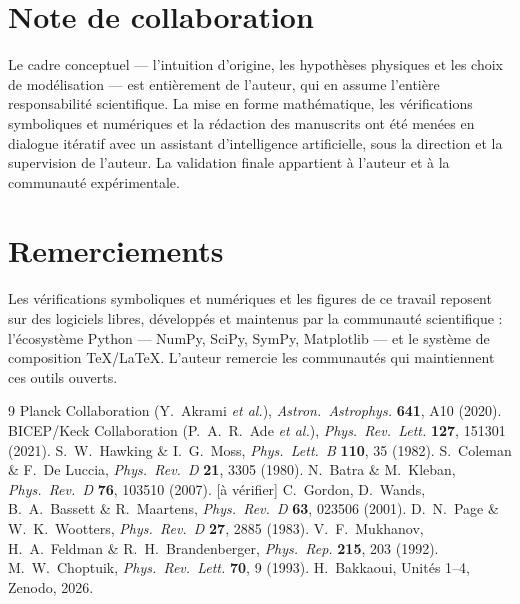 \documentclass[11pt,a4paper]{article}
\begin{document}
\section*{Note de collaboration}
Le cadre conceptuel --- l'intuition d'origine, les hypoth\`eses physiques et les choix de mod\'elisation --- est enti\`erement de l'auteur, qui en assume l'enti\`ere responsabilit\'e scientifique. La mise en forme math\'ematique, les v\'erifications symboliques et num\'eriques et la r\'edaction des manuscrits ont \'et\'e men\'ees en dialogue it\'eratif avec un assistant d'intelligence artificielle, sous la direction et la supervision de l'auteur. La validation finale appartient \`a l'auteur et \`a la communaut\'e exp\'erimentale.

\section*{Remerciements}
Les v\'erifications symboliques et num\'eriques et les figures de ce travail reposent sur des logiciels libres, d\'evelopp\'es et maintenus par la communaut\'e scientifique : l'\'ecosyst\`eme Python --- NumPy, SciPy, SymPy, Matplotlib --- et le syst\`eme de composition \TeX/\LaTeX{}. L'auteur remercie les communaut\'es qui maintiennent ces outils ouverts.

\begin{thebibliography}{9}
\small
{} Planck Collaboration (Y.\ Akrami \textit{et al.}), \textit{Astron.\ Astrophys.} \textbf{641}, A10 (2020).
 BICEP/Keck Collaboration (P.\ A.\ R.\ Ade \textit{et al.}), \textit{Phys.\ Rev.\ Lett.} \textbf{127}, 151301 (2021).
 S.\ W.\ Hawking \& I.\ G.\ Moss, \textit{Phys.\ Lett.\ B} \textbf{110}, 35 (1982).
 S.\ Coleman \& F.\ De Luccia, \textit{Phys.\ Rev.\ D} \textbf{21}, 3305 (1980).
 N.\ Batra \& M.\ Kleban, \textit{Phys.\ Rev.\ D} \textbf{76}, 103510 (2007). [à vérifier]
 C.\ Gordon, D.\ Wands, B.\ A.\ Bassett \& R.\ Maartens, \textit{Phys.\ Rev.\ D} \textbf{63}, 023506 (2001).
 D.\ N.\ Page \& W.\ K.\ Wootters, \textit{Phys.\ Rev.\ D} \textbf{27}, 2885 (1983).
 V.\ F.\ Mukhanov, H.\ A.\ Feldman \& R.\ H.\ Brandenberger, \textit{Phys.\ Rep.} \textbf{215}, 203 (1992).
 M.\ W.\ Choptuik, \textit{Phys.\ Rev.\ Lett.} \textbf{70}, 9 (1993).
 H.\ Bakkaoui, Unités 1–4, Zenodo, 2026.
\end{thebibliography}
\end{document}

